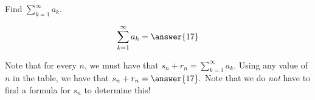 \documentclass{ximera}
\begin{document}
\begin{exercise}
\begin{exercise}
\begin{exercise}
Find $\sum_{k=1}^{\infty} a_k$.

\[
\sum_{k=1}^{\infty} a_k =\answer{17}
\]

\begin{hint}
Note that for every $n$, we must have that $s_n +r_n = \sum_{k=1}^{\infty} a_k$.  Using any value of $n$ in the table, we have that $s_n+r_n = \answer{17}.$  Note that we do \emph{not} have to find a formula for $s_n$ to determine this!
\end{hint}
\end{exercise}

\end{exercise}
\end{exercise}
\end{document}
